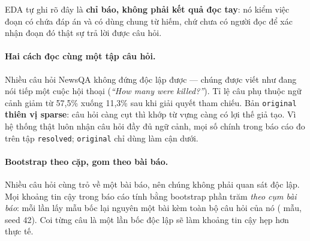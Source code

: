 EDA tự ghi rõ đây là \textbf{chỉ báo, không phải kết quả đọc tay}: nó kiểm việc
đoạn có chứa đáp án và có dùng chung từ hiếm, chứ chưa có người đọc để xác nhận
đoạn đó thật sự trả lời được câu hỏi.

\paragraph{Hai cách đọc cùng một tập câu hỏi.}
Nhiều câu hỏi NewsQA không đứng độc lập được --- chúng được viết như đang nói
tiếp một cuộc hội thoại (\emph{``How many were killed?''}). Tỉ lệ câu phụ thuộc
ngữ cảnh giảm từ 57{,}5\% xuống 11{,}3\% sau khi giải quyết tham chiếu. Bản
\texttt{original} \textbf{thiên vị sparse}: câu hỏi càng cụt thì khớp từ vựng
càng có lợi thế giả tạo. Vì hệ thống thật luôn nhận câu hỏi đầy đủ ngữ cảnh,
mọi số chính trong báo cáo đo trên tập \texttt{resolved}; \texttt{original} chỉ
dùng làm cận dưới.

\paragraph{Bootstrap theo cặp, gom theo bài báo.}
Nhiều câu hỏi cùng trỏ về một bài báo, nên chúng không phải quan sát độc lập.
Mọi khoảng tin cậy trong báo cáo tính bằng bootstrap phần trăm \emph{theo cụm
bài báo}: mỗi lần lấy mẫu bốc lại nguyên một bài kèm toàn bộ câu hỏi của nó
(\NumBootstrapSamples{} mẫu, seed 42). Coi từng câu là một lần bốc độc lập sẽ
làm khoảng tin cậy hẹp hơn thực tế.

